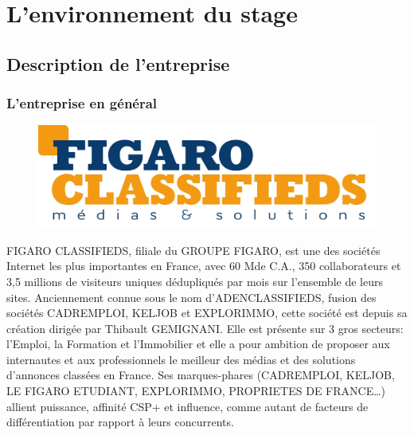 
\chapter{L'environnement du stage} %

\label{environnement} %


\section{Description de l'entreprise}

\subsection{L'entreprise en général}
\begin{figure}[h]
  \centering
  \includegraphics[scale=0.15]{Pictures/logoFC.jpg}
\end{figure}
FIGARO CLASSIFIEDS, filiale du GROUPE FIGARO, est une des sociétés Internet les plus importantes en France, avec 60 M\texteuro de C.A., 350 collaborateurs et 3,5 millions de visiteurs uniques dédupliqués par mois sur l’ensemble de leurs sites.
Anciennement connue sous le nom d'ADENCLASSIFIEDS, fusion des sociétés CADREMPLOI, KELJOB et EXPLORIMMO, cette société est depuis sa création dirigée par Thibault GEMIGNANI.
Elle est présente sur 3 gros secteurs: l’Emploi, la Formation et l’Immobilier et elle a pour ambition de proposer aux internautes et aux professionnels le meilleur des médias et des solutions d'annonces classées en France.
Ses marques-phares (CADREMPLOI, KELJOB, LE FIGARO ETUDIANT, EXPLORIMMO, PROPRIETES DE FRANCE…) allient puissance, affinité CSP+ et influence, comme autant de facteurs de différentiation par rapport à leurs concurrents.

